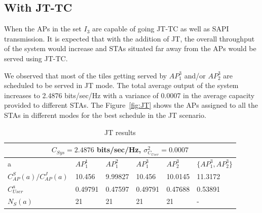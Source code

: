 



\subsection{With JT-TC}
When the APs in the set $I_3$ are capable of going JT-TC as well as SAPI transmission.
It is expected that with the addition of JT, the overall throughput of the system would increase and STAs situated far away from the APs would be served using JT-TC.

We observed that most of the tiles getting served by $ AP_1^3$ and/or $AP_2^3$ are scheduled to be served in JT mode.
The total average output of the system increases to 2.4876 bits/sec/Hz with a variance of 0.0007 in the average capacity provided to different STAs.
The Figure~\ref{fig:JT} shows the APs assigned to all the STAs in different modes for the best schedule in the JT scenario.

\begin{table}[h]
    \centering
    \renewcommand{\arraystretch}{1.35}
    \begin{tabular}{|p{2.5cm}||p{2cm}|p{2cm}|p{2cm}|p{2cm}|p{2cm}|}
        \hline
        \multicolumn{6}{|c|}{$C_{Sys} = 2.4876$ bits/sec/Hz,\hspace{0.5cm}    $\sigma^2_{C_{User}} = 0.0007$}
        \\
        \hline\hline
        a & $AP_1^1$ & $AP_1^2$ & $AP_1^3$ & $AP_2^3$ & $\{AP_1^3, AP_2^3\}$ \\
        \hline\hline
        $C_{AP}^S(a)/C_{AP}^J(a)$ & 10.456 & 9.99827 & 10.456 & 10.0145 & 11.3172
        \\
        \hline
        $C_{User}^a$ & 0.49791 & 0.47597 & 0.49791 & 0.47688 & 0.53891
        \\
        \hline
        $N_S(a)$ & 21 & 21 & 21 & 21 & -
        \\
        \hline
    \end{tabular}
    \caption{JT results}
    \label{tab:JT_results}
\end{table}








